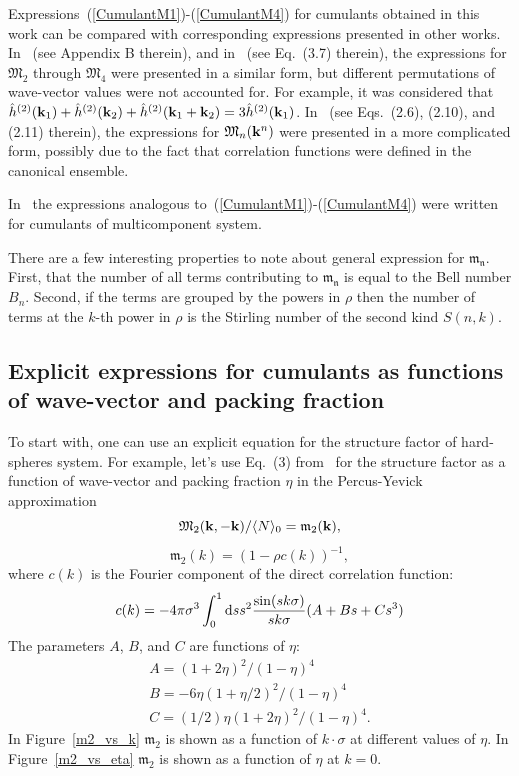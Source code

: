 Expressions~(\ref{CumulantM1})-(\ref{CumulantM4}) for cumulants obtained in this work can be compared with corresponding expressions presented in other works.
In~\cite{YukhJSP1995} (see Appendix B therein), and in~\cite{Idzik1987En} (see Eq.~(3.7) therein), the expressions for $\mathfrak{M}_2$ through $\mathfrak{M}_4$ were presented in a similar form, but different permutations of wave-vector values were not accounted for. For example, it was considered that $\hat{h}^{(2)}(\vb k_1) + \hat{h}^{(2)}(\vb k_2) + \hat{h}^{(2)}(\vb k_1 + \vb k_2) = 3\hat{h}^{(2)}(\vb k_1)$.
In~\cite{Yukh1989tmpEn} (see Eqs.~(2.6), (2.10), and (2.11) therein), the expressions for $\mathfrak{M}_n(\vb k^n)$ were presented in a more complicated form, possibly due to the fact that correlation functions were defined in the canonical ensemble.

In~\cite{Pats1990tmf} the expressions analogous to~(\ref{CumulantM1})-(\ref{CumulantM4}) were written for cumulants of multicomponent system.

There are a few interesting properties to note about general expression for $\mathfrak{m_n}$. First, that the number of all terms contributing to $\mathfrak{m_n}$ is equal to the Bell number $B_n$\cite{cameron1995comb,wikiBellNum}. Second, if the terms are grouped by the powers in $\rho$ then the number of terms at the $k$-th power in $\rho$ is the Stirling number of the second kind $S(n,k)$\cite{cameron1995comb,wikiStirlingNum2}.

\subsection{Explicit expressions for cumulants as functions of wave-vector and packing fraction}
To start with, one can use an explicit equation for the structure factor of hard-spheres system. For example, let's use Eq.~(3) from~\cite{Ashcroft1966} for the structure factor as a function of wave-vector and packing fraction $\eta$ in the Percus-Yevick approximation
\begin{equation}
	\mathfrak{M}_2(\vb k, -\vb k)/\langle N \rangle_0 = \mathfrak{m}_2(\vb k),
\end{equation}
\begin{equation}
	\mathfrak{m}_2(k) = (1 - \rho c(k))^{-1},
\end{equation}
where $c(k)$ is the Fourier component of the direct correlation function:
\begin{equation}
	c(k) = -4\pi\sigma^3\int_{0}^{1} {\rm d} s s^2 \frac{\sin(s k \sigma)}{s k \sigma} (A + Bs +Cs^3)
\end{equation}
The parameters $A$, $B$, and $C$ are functions of $\eta$:
\begin{eqnarray}
	A = (1+2\eta)^2/(1-\eta)^4 
	\nonumber\\
	B = -6\eta(1+\eta/2)^2/(1-\eta)^4
	\nonumber\\
	C = (1/2)\eta(1+2\eta)^2/(1-\eta)^4.
\end{eqnarray}
In Figure~\ref{m2_vs_k} $\mathfrak{m}_2$ is shown as a function of $k\cdot\sigma$ at different values of $\eta$. In Figure~\ref{m2_vs_eta} $\mathfrak{m}_2$ is shown as a function of $\eta$ at $k=0$.

